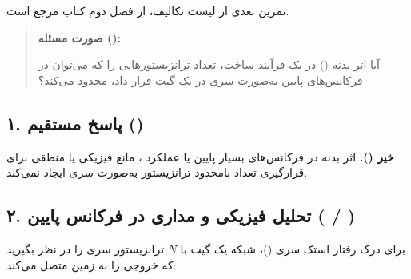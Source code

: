 تمرین بعدی از لیست تکالیف، \textbf{} از فصل دوم کتاب مرجع است.

\begin{quote}
\textbf{صورت مسئله ():}

آیا اثر بدنه (\textbf{}) در یک فرآیند ساخت، تعداد ترانزیستورهایی را که می‌توان در فرکانس‌های پایین به‌صورت سری در یک گیت  قرار داد، محدود می‌کند؟

\end{quote}

\subsection*{۱. پاسخ مستقیم ()}
\textbf{خیر ().} اثر بدنه در فرکانس‌های بسیار پایین یا عملکرد ، مانع فیزیکی یا منطقی برای قرارگیری تعداد نامحدود ترانزیستور به‌صورت سری ایجاد نمی‌کند.

\subsection*{۲. تحلیل فیزیکی و مداری در فرکانس پایین ( / )}

برای درک رفتار استک سری ()، شبکه  یک گیت با \(N\) ترانزیستور سری  را در نظر بگیرید که خروجی را به زمین متصل می‌کند:


